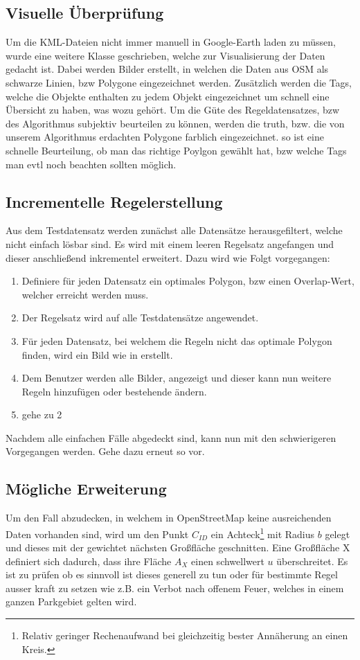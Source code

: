 \subsection{Visuelle Überprüfung}
\label{sec:visuelle_ueberpruefung}
Um die KML-Dateien nicht immer manuell in Google-Earth laden zu müssen, wurde eine weitere Klasse geschrieben, welche zur Visualisierung der Daten gedacht ist.
Dabei werden Bilder erstellt, in welchen die Daten aus OSM als schwarze Linien, bzw Polygone eingezeichnet werden. Zusätzlich werden die Tags, 
welche die Objekte enthalten zu jedem Objekt eingezeichnet um schnell eine Übersicht zu haben, was wozu gehört.
Um die Güte des Regeldatensatzes, bzw des Algorithmus subjektiv beurteilen zu können, werden die truth, bzw. die von unserem Algorithmus erdachten Polygone
farblich eingezeichnet. so ist eine schnelle Beurteilung, ob man das richtige Poylgon gewählt hat, bzw welche Tags man evtl noch beachten sollten möglich.

\subsection{Incrementelle Regelerstellung}
Aus dem Testdatensatz werden zunächst alle Datensätze herausgefiltert, welche nicht einfach lösbar sind.
Es wird mit einem leeren Regelsatz angefangen und dieser anschließend inkrementel erweitert. Dazu wird wie Folgt vorgegangen:
\begin{enumerate}
\item Definiere für jeden Datensatz ein optimales Polygon, bzw einen Overlap-Wert, welcher erreicht werden muss.
\item Der Regelsatz wird auf alle Testdatensätze angewendet.
\item Für jeden Datensatz, bei welchem die Regeln nicht das optimale Polygon finden, wird ein Bild wie in  erstellt.
\item Dem Benutzer werden alle Bilder, angezeigt und dieser kann nun weitere Regeln hinzufügen oder bestehende ändern.
\item gehe zu 2
\end{enumerate}
Nachdem alle einfachen Fälle abgedeckt sind, kann nun mit den schwierigeren Vorgegangen werden.
Gehe dazu erneut so vor.

\subsection{Mögliche Erweiterung}
Um den Fall abzudecken, in welchem in OpenStreetMap keine ausreichenden Daten vorhanden sind, wird um den Punkt $C_{ID}$ ein
Achteck\footnote{Relativ geringer Rechenaufwand bei gleichzeitig bester Annäherung an einen Kreis.} mit Radius $b$ gelegt
und dieses mit der gewichtet nächsten Großfläche geschnitten.
Eine Großfläche X definiert sich dadurch, dass ihre Fläche $A_X$ einen schwellwert $u$ überschreitet.
Es ist zu prüfen ob es sinnvoll ist dieses generell zu tun oder für bestimmte Regel ausser kraft zu setzen wie
z.B. ein Verbot nach offenem Feuer, welches in einem ganzen Parkgebiet gelten wird.